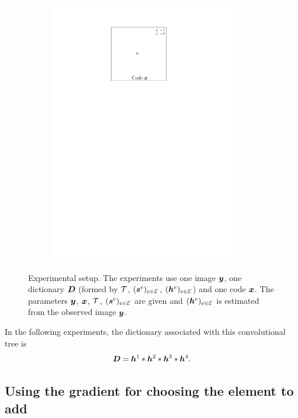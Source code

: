 \begin{figure}[!ht]
\begin{subfigure}[b]{0.32\textwidth}
	\includegraphics[width=0.9\textwidth]{figures/xp_explain/code.pdf}
	\caption{}
\end{subfigure}
\caption{Experimental setup. The experiments use one image $\bm{y}$, one dictionary $\bm{D}$ (formed by $\mathcal T$, $(\bm{s}^e)_{e \in \mathcal E}$, $(\bm{h}^e)_{e \in \mathcal E}$) and one code $\bm{x}$. The parameters $\bm{y}$, $\bm{x}$, $\mathcal T$, $(\bm{s}^e)_{e \in \mathcal E}$ are given and $(\bm{h}^e)_{e \in \mathcal E}$ is estimated from the observed image $\bm{y}$.}\label{fig_xp_explain}
\end{figure}

\noindent
In the following experiments, the dictionary associated with this convolutional tree is 
\begin{equation*}\bm{D} = \bm{h}^1 * \bm{h}^2 * \bm{h}^3 * \bm{h}^4.\end{equation*}

\subsection{Using the gradient for choosing the element to add}

